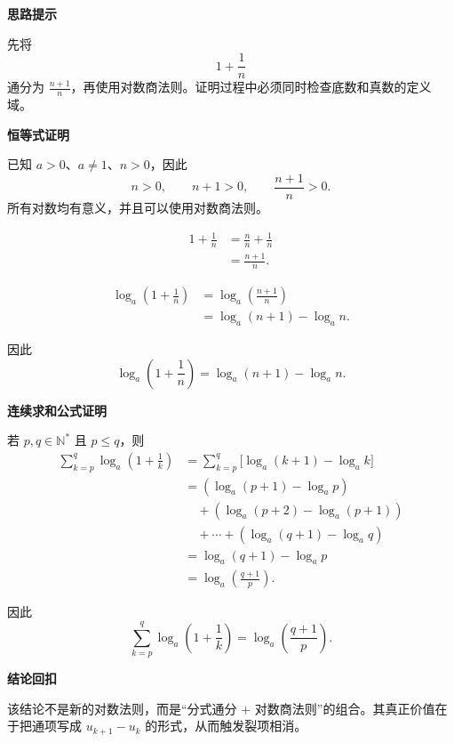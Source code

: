 \begin{proofbox}
	\textbf{\textcolor{CProof}{思路提示}}

	先将
	\[
		1+\frac{1}{n}
	\]
	通分为 \(\frac{n+1}{n}\)，再使用对数商法则。证明过程中必须同时检查底数和真数的定义域。

	\medskip
	\textbf{\textcolor{CProof}{恒等式证明}}
	\begin{description}[style=nextline, leftmargin=2.8em, labelsep=0.5em, itemsep=0.55em]
		\item[\textbf{步骤一（检查定义域）：}]
		      已知 \(a>0\)、\(a\neq1\)、\(n>0\)，因此
		      \[
			      n>0,
			      \qquad
			      n+1>0,
			      \qquad
			      \frac{n+1}{n}>0.
		      \]
		      所有对数均有意义，并且可以使用对数商法则。

		\item[\textbf{步骤二（分式通分）：}]
		      \[
			      \begin{aligned}
				      1+\frac{1}{n}
				       & =\frac{n}{n}+\frac{1}{n} \\
				       & =\frac{n+1}{n}.
			      \end{aligned}
		      \]

		\item[\textbf{步骤三（应用对数商法则）：}]
		      \[
			      \begin{aligned}
				      \log_a\!\left(1+\frac{1}{n}\right)
				       & =\log_a\!\left(\frac{n+1}{n}\right) \\
				       & =\log_a(n+1)-\log_a n.
			      \end{aligned}
		      \]
	\end{description}

	因此
	\[
		\boxed{
			\log_a\!\left(1+\frac{1}{n}\right)
			=\log_a(n+1)-\log_a n
		}.
	\]

	\medskip
	\textbf{\textcolor{CProof}{连续求和公式证明}}

	若 \(p,q\in\mathbb N^*\) 且 \(p\leq q\)，则
	\[
		\begin{aligned}
			\sum_{k=p}^{q}\log_a\!\left(1+\frac{1}{k}\right)
			 & =\sum_{k=p}^{q}\bigl[\log_a(k+1)-\log_a k\bigr] \\
			 & =(\log_a(p+1)-\log_a p)                         \\
			 & \quad +(\log_a(p+2)-\log_a(p+1))                \\
			 & \quad +\cdots +(\log_a(q+1)-\log_a q)           \\
			 & =\log_a(q+1)-\log_a p                           \\
			 & =\log_a\!\left(\frac{q+1}{p}\right).
		\end{aligned}
	\]

	因此
	\[
		\boxed{
			\sum_{k=p}^{q}\log_a\!\left(1+\frac{1}{k}\right)
			=\log_a\!\left(\frac{q+1}{p}\right)
		}.
	\]

	\medskip
	\textbf{\textcolor{CProof}{结论回扣}}

	该结论不是新的对数法则，而是“分式通分 + 对数商法则”的组合。其真正价值在于把通项写成 \(u_{k+1}-u_k\) 的形式，从而触发裂项相消。
\end{proofbox}